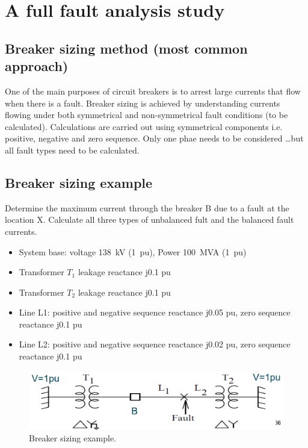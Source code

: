 \section{A full fault analysis study}
\subsection{Breaker sizing method (most common approach)}
One of the main purposes of circuit breakers is to arrest large currents that flow when there is a fault. Breaker sizing is achieved by understanding currents flowing under both symmetrical and non-symmetrical fault conditions (to be calculated). Calculations are carried out using symmetrical components i.e. positive, negative and zero sequence. Only one phae needs to be considered \dots but all fault types need to be calculated.
\subsection{Breaker sizing example}
Determine the maximum current through the breaker B due to a fault at the location X. Calculate all three types of unbalanced fult and the balanced fault currents.
\begin{itemize}
	\item System base: voltage \SI{138}{kV} (\SI{1}{pu}), Power \SI{100}{MVA} (\SI{1}{pu})
	\item Transformer $T_1$ leakage reactance j0.1 pu
	\item Transformer $T_2$ leakage reactance j0.1 pu
	\item Line L1: positive and negative sequence reactance j0.05 pu, zero sequence reactance j0.1 pu
	\item Line L2: positive and negative sequence reactance j0.02 pu, zero sequence reactance j0.1 pu
\end{itemize}
\begin{figure}[H]
	\centering
	\includegraphics[width = \textwidth]{./img/figure39.png}
	\caption{Breaker sizing example.}
\end{figure}
